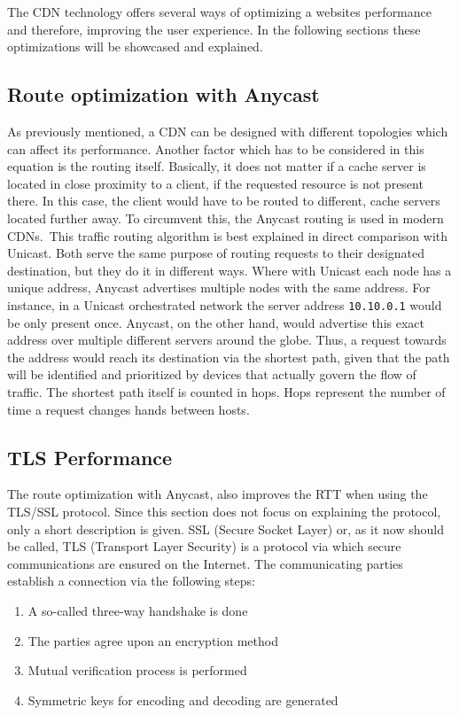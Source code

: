 The CDN technology offers several ways of optimizing a websites performance and therefore, improving the user experience. In the following sections these optimizations will be showcased and explained.

\subsection{Route optimization with Anycast}

As previously mentioned, a CDN can be designed with different topologies which can affect its performance. Another factor which has to be considered in this equation is the routing itself. Basically, it does not matter if a cache server is located in close proximity to a client, if the requested resource is not present there. In this case, the client would have to be routed to different, cache servers located further away. 
To circumvent this, the Anycast routing is used in modern CDNs. This traffic routing algorithm is best explained in direct comparison with Unicast. Both serve the same purpose of routing requests to their designated destination, but they do it in different ways. Where with Unicast each node has a unique address, Anycast advertises multiple nodes with the same address.
For instance, in a Unicast orchestrated network the server address \texttt{10.10.0.1} would be only present once. Anycast, on the other hand, would advertise this exact address over multiple different servers around the globe. Thus, a request towards the address would reach its destination via the shortest path, given that the path will be identified and prioritized by devices that actually govern the flow of traffic.
The shortest path itself is counted in hops. Hops represent the number of time a request changes hands between hosts.\cite{cdn_route_opt}

\subsection{TLS Performance}

The route optimization with Anycast, also improves the RTT when using the TLS/SSL protocol. Since this section does not focus on explaining the protocol, only a short description is given.
SSL (Secure Socket Layer) or, as it now should be called, TLS (Transport Layer Security) is a protocol via which secure communications are ensured on the Internet. The communicating parties establish a connection via the following steps:

\begin{enumerate}[noitemsep]
	\item A so-called three-way handshake is done
	\item The parties agree upon an encryption method
	\item Mutual verification process is performed
	\item Symmetric keys for encoding and decoding are generated
\end{enumerate}

